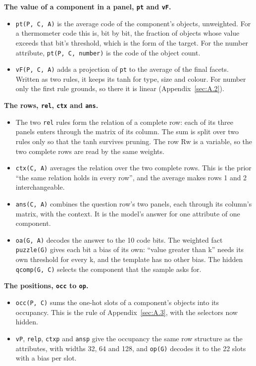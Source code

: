 \textbf{The value of a component in a panel, \texttt{pt} and \texttt{vF}.}

\begin{itemize}
\item \texttt{pt(P, C, A)} is the average code of the component's objects, unweighted. For a thermometer code this is, bit by bit, the fraction of objects whose value exceeds that bit's threshold, which is the form of the target. For the number attribute, \texttt{pt(P, C, number)} is the code of the object count.
\item \texttt{vF(P, C, A)} adds a projection of \texttt{pt} to the average of the final facets. Written as two rules, it keeps its tanh for type, size and colour. For number only the first rule grounds, so there it is linear (Appendix~\ref{sec:A.2}).
\end{itemize}

\textbf{The rows, \texttt{rel}, \texttt{ctx} and \texttt{ans}.}

\begin{itemize}
\item The two \texttt{rel} rules form the relation of a complete row: each of its three panels enters through the matrix of its column. The sum is split over two rules only so that the tanh survives pruning. The row Rw is a variable, so the two complete rows are read by the same weights.
\item \texttt{ctx(C, A)} averages the relation over the two complete rows. This is the prior ``the same relation holds in every row'', and the average makes rows 1 and 2 interchangeable.
\item \texttt{ans(C, A)} combines the question row's two panels, each through its column's matrix, with the context. It is the model's answer for one attribute of one component.
\item \texttt{oa(G, A)} decodes the answer to the 10 code bits. The weighted fact \texttt{puzzle(G)} gives each bit a bias of its own: ``value greater than k'' needs its own threshold for every k, and the template has no other bias. The hidden \texttt{qcomp(G, C)} selects the component that the sample asks for.
\end{itemize}

\textbf{The positions, \texttt{occ} to \texttt{op}.}

\begin{itemize}
\item \texttt{occ(P, C)} sums the one-hot slots of a component's objects into its occupancy. This is the rule of Appendix~\ref{sec:A.3}, with the selectors now hidden.
\item \texttt{vP}, \texttt{relp}, \texttt{ctxp} and \texttt{ansp} give the occupancy the same row structure as the attributes, with widths 32, 64 and 128, and \texttt{op(G)} decodes it to the 22 slots with a bias per slot.
\end{itemize}

